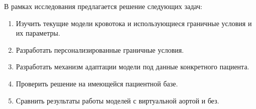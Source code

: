 В рамках исследования предлагается решение следующих задач:
\begin{enumerate}
	\item Изучить текущие модели кровотока и использующиеся граничные условия и их параметры.
	\item Разработать персонализированные граничные условия.
	\item Разработать механизм адаптации модели под данные конкретного пациента.
	\item Проверить решение на имеющейся пациентной базе.
	\item Сравнить результаты работы моделей с виртуальной аортой и без.
\end{enumerate}


% 










